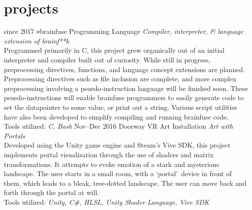 \documentclass[]{friggeri-cv}
\begin{document}
\section{projects}

\begin{entrylist}
  \entry
    {since 2017}
    {\texttt{>}brainfuse}
    {Programming Language}
    {\emph{Compiler, interpreter, \& language extension of brainf**k}\\Programmed primarily in C, this project grew organically out of an initial interpreter and compiler built out of curiosity. While still in progress, preprocessing directives, functions, and language concept extensions are planned. Preprocessing directives such as file inclusion are complete, and more complex preprocessing involving a psuedo-instruction language will be finished soon. These psuedo-instructions will enable brainfuse programmers to easily generate code to set the datapointer to some value, or print out a string. Various script utilities have also been developed to simplify compiling and running brainfuse code.\\Tools utilized: \emph{C, Bash}}
  \entry
    {Nov--Dec 2016}
    {Doorway}
    {VR Art Installation}
    {\emph{Art with Portals}\\Developed using the Unity game engine and Steam's Vive SDK, this project implements portal visualization through the use of shaders and matrix transformations. It attempts to evoke emotion of a stark and mysterious landscape. The user starts in a small room, with a \lq portal\rq\ device in front of them, which leads to a bleak, tree-dotted landscape. The user can move back and forth through the portal at will.\\Tools utilized: \emph{Unity, C\#, HLSL, Unity Shader Language, Vive SDK}}
\end{entrylist}
\end{document}
